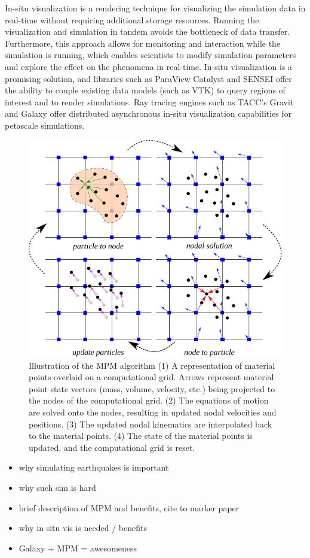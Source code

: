 \documentclass[journal]{IEEEtran}
\begin{document}
In-situ visualization is a rendering technique for visualizing the simulation data in real-time without requiring additional storage resources. Running the visualization and simulation in tandem avoids the bottleneck of data transfer. Furthermore, this approach allows for monitoring and interaction while the simulation is running, which enables scientists to modify simulation parameters and explore the effect on the phenomena in real-time. In-situ visualization is a promising solution, and libraries such as ParaView Catalyst and SENSEI offer the ability to couple existing data models (such as VTK) to query regions of interest and to render simulations. Ray tracing engines such as TACC's Gravit and Galaxy offer distributed asynchronous in-situ visualization capabilities for petascale simulations.


\begin{figure}[!htbp]
    \centering
    \includegraphics[width=\linewidth]{figs/mpm.pdf}
    \caption{Illustration of the MPM algorithm (1) A representation of material points overlaid on a computational grid. Arrows represent material point state vectors (mass, volume, velocity, etc.) being projected to the nodes of the computational grid. (2) The equations of motion are solved onto the nodes, resulting in updated nodal velocities and positions. (3) The updated nodal kinematics are interpolated back to the material points. (4) The state of the material points is updated, and the computational grid is reset.}
    \label{fig:mpm}
\end{figure}
\begin{itemize}
  \item why simulating earthquakes is important
  \item why such sim is hard
  \item brief description of MPM and benefits, cite to marker paper
  \item why in situ vis is needed / benefits
  \item Galaxy + MPM = awesomeness
\end{itemize}
  
\end{document}
